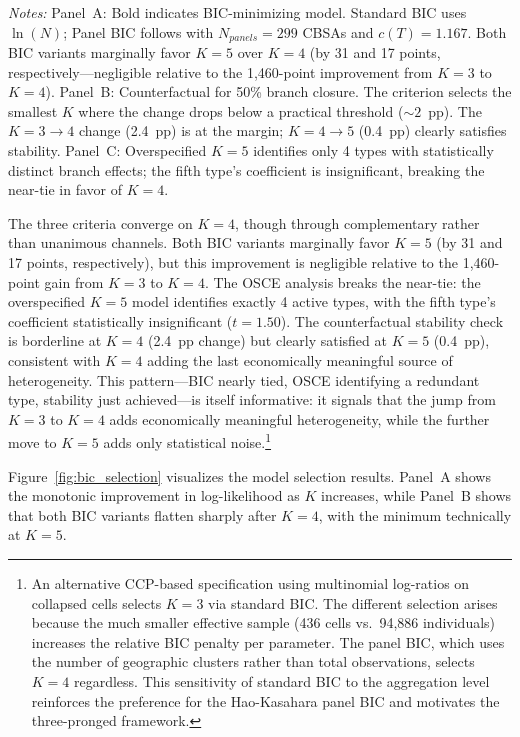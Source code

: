 \documentclass[12pt]{article}
\begin{document}
\begin{table}[H]
\begin{threeparttable}
\begin{tablenotes}
\small
\item \textit{Notes:} Panel~A: Bold indicates BIC-minimizing model. Standard BIC uses $\ln(N)$; Panel BIC follows \citet{hao2025} with $N_{panels} = 299$ CBSAs and $c(T) = 1.167$. Both BIC variants marginally favor $K=5$ over $K=4$ (by 31 and 17 points, respectively---negligible relative to the 1,460-point improvement from $K=3$ to $K=4$). Panel~B: Counterfactual for 50\% branch closure. The \citet{bonhomme2022} criterion selects the smallest $K$ where the change drops below a practical threshold ($\sim 2$~pp). The $K=3 \to 4$ change (2.4~pp) is at the margin; $K=4 \to 5$ (0.4~pp) clearly satisfies stability. Panel~C: Overspecified $K=5$ identifies only 4 types with statistically distinct branch effects; the fifth type's coefficient is insignificant, breaking the near-tie in favor of $K=4$.
\end{tablenotes}
\end{threeparttable}
\end{table}

The three criteria converge on $K=4$, though through complementary rather than unanimous channels. Both BIC variants marginally favor $K=5$ (by 31 and 17 points, respectively), but this improvement is negligible relative to the 1,460-point gain from $K=3$ to $K=4$. The OSCE analysis breaks the near-tie: the overspecified $K=5$ model identifies exactly 4 active types, with the fifth type's coefficient statistically insignificant ($t = 1.50$). The counterfactual stability check is borderline at $K=4$ (2.4~pp change) but clearly satisfied at $K=5$ (0.4~pp), consistent with $K=4$ adding the last economically meaningful source of heterogeneity. This pattern---BIC nearly tied, OSCE identifying a redundant type, stability just achieved---is itself informative: it signals that the jump from $K=3$ to $K=4$ adds economically meaningful heterogeneity, while the further move to $K=5$ adds only statistical noise.\footnote{An alternative CCP-based specification using multinomial log-ratios on collapsed cells selects $K=3$ via standard BIC. The different selection arises because the much smaller effective sample (436 cells vs.\ 94,886 individuals) increases the relative BIC penalty per parameter. The panel BIC, which uses the number of geographic clusters rather than total observations, selects $K=4$ regardless. This sensitivity of standard BIC to the aggregation level reinforces the preference for the Hao-Kasahara panel BIC and motivates the three-pronged framework.}

Figure~\ref{fig:bic_selection} visualizes the model selection results. Panel~A shows the monotonic improvement in log-likelihood as $K$ increases, while Panel~B shows that both BIC variants flatten sharply after $K=4$, with the minimum technically at $K=5$.
\end{document}
